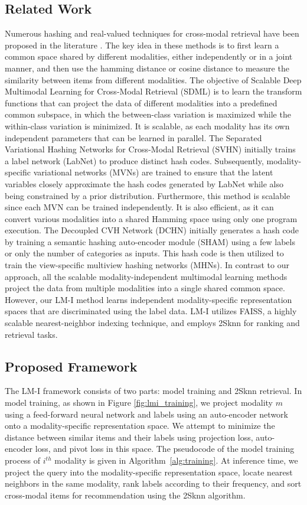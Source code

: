 \subsection{Related Work}
Numerous hashing and real-valued techniques for cross-modal retrieval have been proposed in the literature \cite{djsrh, ocmfh, acmr, dscmr}. The key idea in these methods is to first learn a common space shared by different modalities, either independently or in a joint manner, and then use the hamming distance or cosine distance to measure the similarity between items from different modalities. The objective of Scalable Deep Multimodal Learning for Cross-Modal Retrieval (SDML) \cite{sdml} is to learn the transform functions that can project the data of different modalities into a predefined common subspace, in which the between-class variation is maximized while the within-class variation is minimized. It is scalable, as each modality has its own independent parameters that can be learned in parallel. The Separated Variational Hashing Networks for Cross-Modal Retrieval (SVHN) \cite{svhn} initially trains a label network (LabNet) to produce distinct hash codes. Subsequently, modality-specific variational networks (MVNs) are trained to ensure that the latent variables closely approximate the hash codes generated by LabNet while also being constrained by a prior distribution. Furthermore, this method is scalable since each MVN can be trained independently. It is also efficient, as it can convert various modalities into a shared Hamming space using only one program execution. The Decoupled CVH Network (DCHN) \cite{joint} initially generates a hash code by training a semantic hashing auto-encoder module (SHAM) using a few labels or only the number of categories as inputs. This hash code is then utilized to train the view-specific multiview hashing networks (MHNs). In contrast to our approach, all the scalable modality-independent multimodal learning methods project the data from multiple modalities into a single shared common space. However, our LM-I method learns independent modality-specific representation spaces that are discriminated using the label data. LM-I utilizes FAISS, a highly scalable nearest-neighbor indexing technique, and employs 2Sknn for ranking and retrieval tasks.

\subsection{Proposed Framework}
The LM-I framework consists of two parts: model training and 2Sknn retrieval. In model training, as shown in Figure \ref{fig:lmi_training}, we project modality \(m\) using a feed-forward neural network and labels using an auto-encoder network onto a modality-specific representation space. We attempt to minimize the distance between similar items and their labels using projection loss, auto-encoder loss, and pivot loss in this space. The pseudocode of the model training process of $i^{th}$ modality is given in Algorithm~\ref{alg:training}. At inference time, we project the query into the modality-specific representation space, locate nearest neighbors in the same modality, rank labels according to their frequency, and sort cross-modal items for recommendation using the 2Sknn algorithm. 

